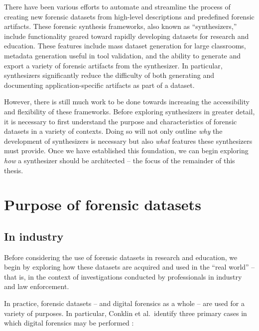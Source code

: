 \documentclass[letterpaper,12pt]{report}
\begin{document}
There have been various efforts to automate and streamline the process
of creating new forensic datasets from high-level descriptions and
predefined forensic artifacts. These forensic synthesis frameworks, also
known as ``synthesizers,'' include functionality geared toward rapidly
developing datasets for research and education. These features include
mass dataset generation for large classrooms, metadata generation useful
in tool validation, and the ability to generate and export a variety of
forensic artifacts from the synthesizer. In particular, synthesizers
significantly reduce the difficulty of both generating and documenting
application-specific artifacts as part of a dataset.

However, there is still much work to be done towards increasing the
accessibility and flexibility of these frameworks. Before exploring
synthesizers in greater detail, it is necessary to first understand the
purpose and characteristics of forensic datasets in a variety of
contexts. Doing so will not only outline \emph{why} the development of
synthesizers is necessary but also \emph{what} features these
synthesizers must provide. Once we have established this foundation, we
can begin exploring \emph{how} a synthesizer should be architected --
the focus of the remainder of this thesis.

\section{Purpose of forensic
datasets}\label{purpose-of-forensic-datasets}

\subsection{In industry}\label{in-industry}

Before considering the use of forensic datasets in research and
education, we begin by exploring how these datasets are acquired and
used in the ``real world'' -- that is, in the context of investigations
conducted by professionals in industry and law enforcement.

In practice, forensic datasets -- and digital forensics as a whole --
are used for a variety of purposes. In particular, Conklin et
al.~identify three primary cases in which digital forensics may be
performed \cite{conklinComputerForensics2022}:
\end{document}
